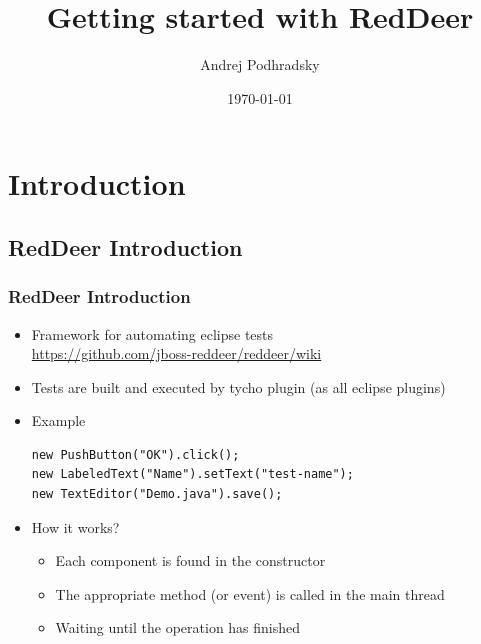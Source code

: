 \documentclass{beamer}
\begin{document}
\title{Getting started with RedDeer}   
\author{Andrej Podhradsky}
\date{\today} 



\frame{\titlepage} 



\section{Introduction}
\subsection{RedDeer Introduction}
\begin{frame}[fragile]
\frametitle{RedDeer Introduction}
\begin{itemize}
\item Framework for automating eclipse tests\\\url{https://github.com/jboss-reddeer/reddeer/wiki}
\item Tests are built and executed by tycho plugin (as all eclipse plugins)
\item Example
\begin{lstlisting}
new PushButton("OK").click();
new LabeledText("Name").setText("test-name");
new TextEditor("Demo.java").save();
\end{lstlisting}
\item How it works?
\begin{itemize}
\item Each component is found in the constructor
\item The appropriate method (or event) is called in the main thread
\item Waiting until the operation has finished
\end{itemize}
\end{itemize}
\end{frame}
\end{document}
